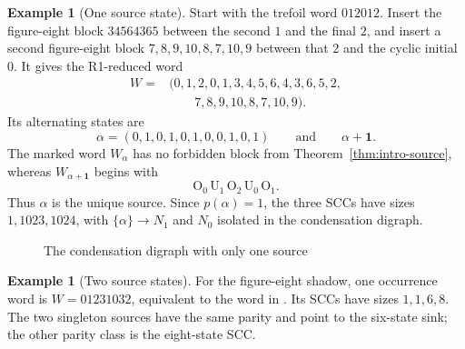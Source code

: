 \documentclass[11pt]{amsart}
\theoremstyle{definition}
\newtheorem{example}[theorem]{Example}
\theoremstyle{remark}
\newcommand{\one}{\mathbf 1}
\begin{document}
\begin{example}[One source state]\label{ex:one-source}
Start with the trefoil word \(012012\).  Insert the figure-eight block
\(34564365\) between the second \(1\) and the final \(2\), and insert a
second figure-eight block \(7,8,9,10,8,7,10,9\) between that \(2\) and the
cyclic initial \(0\).  It gives the R1-reduced word
\[
\begin{aligned}
W={}&(0,1,2,0,1,3,4,5,6,4,3,6,5,2,\\
      &\qquad 7,8,9,10,8,7,10,9).
\end{aligned}
\]
Its alternating states are
\[
  \alpha=(0,1,0,1,0,1,0,0,1,0,1)
  \qquad\text{and}\qquad \alpha+\one.
\]
The marked word \(W_\alpha\) has no forbidden block from
Theorem~\ref{thm:intro-source}, whereas
\(W_{\alpha+\one}\) begins with
\[
  \mathrm O_0\,\mathrm U_1\,\mathrm O_2\,
  \mathrm U_0\,\mathrm O_1.
\]
Thus \(\alpha\) is the unique source.  Since \(p(\alpha)=1\), the three SCCs
have sizes \(1,1023,1024\), with \(\{\alpha\}\to N_1\) and \(N_0\)
isolated in the condensation digraph.
\end{example}

\begin{figure}[ht]
\centering
\begin{minipage}[c]{.39\textwidth}
  \centering
\end{minipage}
\caption{The condensation digraph with only one source}
\label{fig:one-source-condensation}
\end{figure}

\begin{example}[Two source states]\label{ex:figure-eight}
For the figure-eight shadow, one occurrence word is
\(W=01231032\), equivalent to the word in
\cite[Example~4.1 and Figure~10]{ChengLiaoSong2025}.  Its SCCs have sizes
\(1,1,6,8\).  The two singleton sources have the same parity and point to the
six-state sink; the other parity class is the eight-state SCC.
\end{example}
\end{document}
